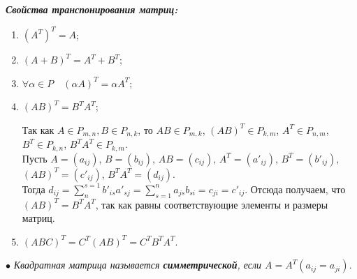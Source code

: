 \textbf{\textit{Свойства транспонирования матриц:}}\begin{enumerate}
	\item $(A^T)^T = A$;
	\item $(A+B)^T = A^T + B^T$;
	\item $\forall\alpha \in P\quad (\alpha A)^T = \alpha A^T$;
	\item $(A B)^T = B^T A^T$;
	\begin{Proof}
		Так как $A \in P_{m,n}, B \in P_{n,k}$, то $AB\in P_{m,k}$, $(AB)^T\in P_{k,m}$, $A^T\in P_{n,m}$, $B^T\in P_{k,n}$, $B^TA^T\in P_{k,m}$.\\
		Пусть $A = (a_{ij})$, $B = (b_{ij})$, $AB = (c_{ij})$, $A^T=(a'_{ij})$, $B^T=(b'_{ij})$, $(AB)^T = (c'_{ij})$, $B^TA^T = (d_{ij})$. \\Тогда $d_{ij} = \sum_{n}^{s=1}b'_{is}a'_{sj} = \sum_{s=1}^na_{js}b_{si} = c_{ji} = c'_{ij}$. Отсюда получаем, что $(AB)^T=B^TA^T$, так как равны соответствующие элементы и размеры матриц.
	\end{Proof}
	\item $(ABC)^T = C^T(AB)^T = C^TB^TA^T$.
\end{enumerate}
$\bullet$ \textit{Квадратная матрица называется \textbf{симметрической}, если $A = A^T (a_{ij} = a_{ji})$}.


